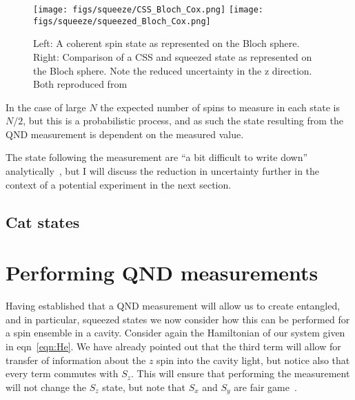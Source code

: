 \documentclass{article}
\begin{document}
\begin{figure}
  \centering
  \texttt{[image: figs/squeeze/CSS\_Bloch\_Cox.png]}
  \texttt{[image: figs/squeeze/squeezed\_Bloch\_Cox.png]}
  \caption{Left: A coherent spin state as represented on the Bloch sphere.
  Right: Comparison of a CSS and squeezed state as represented on the Bloch
  sphere. Note the reduced uncertainty in the z direction.
  Both reproduced from~\cite{Cox2016}}
  \label{CSSbloch}
\end{figure}


In the case of large $N$ the expected number of spins to measure in each state
is $N/2$, but this is a probabilistic process, and as such the state resulting
from the QND measurement is dependent on the measured value.


The state following the measurement are ``a bit difficult to write down''
analytically~\cite{Cox2016}, but I will discuss the reduction in uncertainty
further in the context of a potential experiment in the next section.

\subsection{Cat states}


\section{Performing QND measurements}

Having established that a QND measurement will allow us to create entangled,
and in particular, squeezed states we now consider how this can be performed
for a spin ensemble in a cavity. Consider again the Hamiltonian of our system
given in eqn~\ref{eqn:He}. We have already pointed out that the
third term will allow for transfer of information about the $z$ spin into the
cavity light, but notice also that every term commutes with $S_z$. This will
ensure that performing the measurement will not change the $S_z$ state, but
note that $S_x$ and $S_y$ are fair game~\cite{SchleierSmith2011}.
\end{document}
